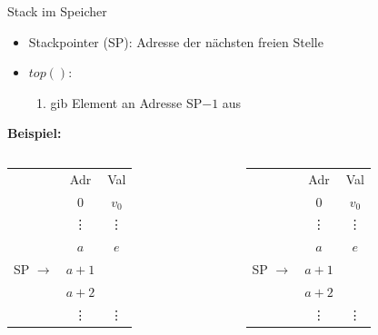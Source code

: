 \begin{frame}{Stack im Speicher}
	\begin{itemize}
		\item Stackpointer (SP): Adresse der nächsten freien Stelle
		\item $top()$: \begin{enumerate}
			\item gib Element an Adresse SP$-1$ aus
		\end{enumerate}
	\end{itemize}

	\bigskip
	\textbf{Beispiel:}
	\begin{columns}	
		\begin{column}{.3\textwidth}
			\centering \begin{tabular}{cc|c}
				& Adr & Val \\
				\cline{2-3}
				& $0$ & $v_0$ \\
				& \vdots & \vdots \\
				& $a$ & $e$\\
				SP $\rightarrow$ & $a + 1$ &  \\
				& $a + 2$ &  \\
				& \vdots & \vdots 
			\end{tabular}
		\end{column}
		\begin{column}{.3\textwidth}
			\centering \begin{tabular}{cc|c}
				& Adr & Val \\
				\cline{2-3}
				& $0$ & $v_0$ \\
				& \vdots & \vdots \\
				& $a$ & $e$\\
				SP $\rightarrow$ & $a + 1$ &  \\
				& $a + 2$ &  \\
				& \vdots & \vdots 
			\end{tabular}
		\end{column}
	\end{columns}
\end{frame}

